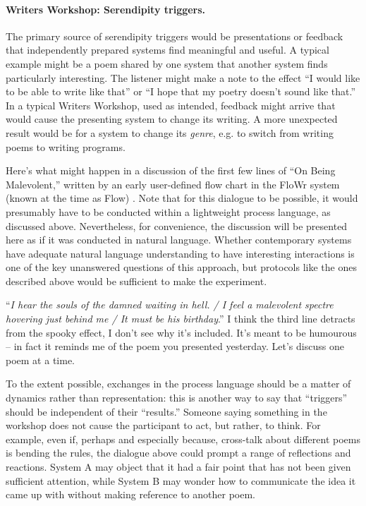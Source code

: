 \paragraph{Writers Workshop: Serendipity triggers.}

The primary source of serendipity triggers would be presentations or
feedback that independently prepared systems find meaningful and
useful.  A typical example might be a poem shared by one system that
another system finds particularly interesting.  The listener might
make a note to the effect ``I would like to be able to write like
that'' or ``I hope that my poetry doesn't sound like that.''  In a
typical Writers Workshop, used as intended, feedback might arrive that
would cause the presenting system to change its writing.  A more
unexpected result would be for a system to change its \emph{genre},
e.g. to switch from writing poems to writing programs.

Here's what might happen in a discussion of the first few lines of
``On Being Malevolent,'' written by an early user-defined flow chart
in the {\sf FloWr} system (known at the time as {\sf Flow})
\cite{colton-flowcharting}.  Note that for this dialogue to be
possible, it would presumably have to be conducted within a
lightweight process language, as discussed above.  Nevertheless, for
convenience, the discussion will be presented here as if it was
conducted in natural language.  Whether contemporary systems have
adequate natural language understanding to have interesting
interactions is one of the key unanswered questions of this approach,
but protocols like the ones described above would be sufficient to
make the experiment.

\begin{center}
\begin{minipage}{.9\textwidth}
\begin{dialogue}
 ``\emph{I hear the souls of the
  damned waiting in hell. / I feel a malevolent
  spectre hovering just behind me / It must be
  his birthday}.''
%
 I think the third line detracts
from the spooky effect, I don't see why it's
included.
%
 It's meant to be humourous -- in fact it reminds me
of the poem you presented yesterday.
%
 Let's discuss one poem at a
time.
\end{dialogue}
\end{minipage}
\end{center}

To the extent possible, exchanges in the process language should be a
matter of dynamics rather than representation: this is another way to
say that ``triggers'' should be independent of their ``results.''
Someone saying something in the workshop does not cause the
participant to act, but rather, to think.  
%
For example, even if, perhaps and especially because, cross-talk about
different poems is bending the rules, the dialogue above could prompt
a range of reflections and reactions.  System A may object that it had
a fair point that has not been given sufficient attention, while
System B may wonder how to communicate the idea it came up with
without making reference to another poem.

